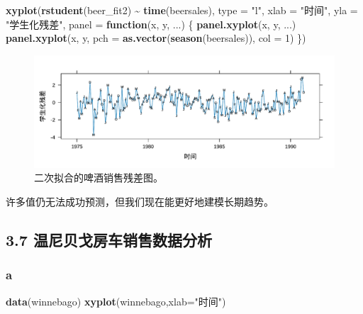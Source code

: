\documentclass[
]{article}
\newenvironment{Shaded}{\begin{snugshade}}{\end{snugshade}}
\newcommand{\AttributeTok}[1]{\textcolor[rgb]{0.13,0.29,0.53}{#1}}
\newcommand{\ControlFlowTok}[1]{\textcolor[rgb]{0.13,0.29,0.53}{\textbf{#1}}}
\newcommand{\DecValTok}[1]{\textcolor[rgb]{0.00,0.00,0.81}{#1}}
\newcommand{\FunctionTok}[1]{\textcolor[rgb]{0.13,0.29,0.53}{\textbf{#1}}}
\newcommand{\NormalTok}[1]{#1}
\newcommand{\SpecialCharTok}[1]{\textcolor[rgb]{0.81,0.36,0.00}{\textbf{#1}}}
\newcommand{\StringTok}[1]{\textcolor[rgb]{0.31,0.60,0.02}{#1}}
\begin{document}
\begin{Shaded}
\begin{Highlighting}[]
\FunctionTok{xyplot}\NormalTok{(}\FunctionTok{rstudent}\NormalTok{(beer\_fit2) }\SpecialCharTok{\textasciitilde{}} \FunctionTok{time}\NormalTok{(beersales), }\AttributeTok{type =} \StringTok{"l"}\NormalTok{,}
       \AttributeTok{xlab =} \StringTok{"时间"}\NormalTok{, }\AttributeTok{yla =} \StringTok{"学生化残差"}\NormalTok{,}
       \AttributeTok{panel =} \ControlFlowTok{function}\NormalTok{(x, y, ...) \{}
         \FunctionTok{panel.xyplot}\NormalTok{(x, y, ...)}
         \FunctionTok{panel.xyplot}\NormalTok{(x, y, }\AttributeTok{pch =} \FunctionTok{as.vector}\NormalTok{(}\FunctionTok{season}\NormalTok{(beersales)), }\AttributeTok{col =} \DecValTok{1}\NormalTok{)}
\NormalTok{       \})}
\end{Highlighting}
\end{Shaded}

\begin{figure}
\centering
\includegraphics{chapter3_files/figure-latex/rst-beer2-1.pdf}
\caption{\label{fig:rst-beer2}二次拟合的啤酒销售残差图。}
\end{figure}

许多值仍无法成功预测，但我们现在能更好地建模长期趋势。

\hypertarget{ux6e29ux5c3cux8d1dux6208ux623fux8f66ux9500ux552eux6570ux636eux5206ux6790}{%
\subsection{3.7 温尼贝戈房车销售数据分析}\label{ux6e29ux5c3cux8d1dux6208ux623fux8f66ux9500ux552eux6570ux636eux5206ux6790}}

\hypertarget{a-3}{%
\subsubsection*{a}\label{a-3}}

\begin{Shaded}
\begin{Highlighting}[]
\FunctionTok{data}\NormalTok{(winnebago)}
\FunctionTok{xyplot}\NormalTok{(winnebago,}\AttributeTok{xlab=}\StringTok{"时间"}\NormalTok{)}
\end{Highlighting}
\end{Shaded}
\end{document}
